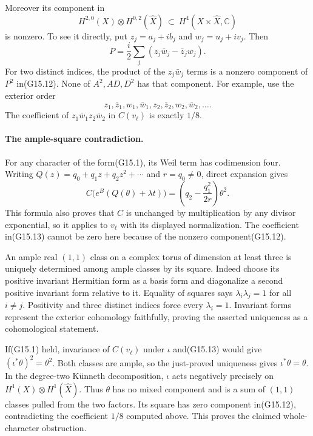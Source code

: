 Moreover its component in
\[
 H^{2,0}(X)\otimes H^{0,2}(\widehat X)
          \ \subset\ H^4(X\times\widehat X,\mathbb C)       \tag{G15.12}
\]
is nonzero. To see it directly, put
$z_j=a_j+ib_j$ and $w_j=u_j+iv_j$. Then
\[
       P=\frac{i}{2}\sum_j
             (z_j\bar w_j-\bar z_jw_j).
\]
For two distinct indices, the product of the
$z_j\bar w_j$ terms is a nonzero component of $P^2$
in(G15.12). None of $A^2,AD,D^2$ has that component.
For example, use the exterior order
\[
       z_1,\bar z_1,w_1,\bar w_1,z_2,\bar z_2,w_2,\bar w_2,\ldots.
\]
The coefficient of
$z_1\bar w_1z_2\bar w_2$ in $C(v_\ell)$ is exactly $1/8$.

\paragraph{The ample-square contradiction.}
For any character of the form(G15.1), its Weil term has
codimension four. Writing $Q(z)=q_0+q_1z+q_2z^2+\cdots$
and $r=q_0\ne0$, direct expansion gives
\[
       C\bigl(e^B(Q(\theta)+\lambda t)\bigr)
               =\left(q_2-\frac{q_1^2}{2r}\right)\theta^2.
                                                               \tag{G15.13}
\]
This formula also proves that $C$ is unchanged by
multiplication by any divisor exponential, so it applies
to $v_\ell$ with its displayed normalization.
The coefficient in(G15.13) cannot be zero here because
of the nonzero component(G15.12).

An ample real $(1,1)$ class on a complex torus of dimension
at least three is uniquely determined among ample classes
by its square. Indeed choose its positive invariant
Hermitian form as a basis form and diagonalize a second
positive invariant form relative to it. Equality of
squares says $\lambda_i\lambda_j=1$ for all $i\ne j$.
Positivity and three distinct indices force every
$\lambda_i=1$. Invariant forms represent the exterior
cohomology faithfully, proving the asserted uniqueness
as a cohomological statement.

If(G15.1) held, invariance of $C(v_\ell)$ under $\iota$
and(G15.13) would give
$(\iota^*\theta)^2=\theta^2$. Both classes are ample,
so the just-proved uniqueness gives $\iota^*\theta=\theta$.
In the degree-two K\"unneth decomposition, $\iota$
acts negatively precisely on
$H^1(X)\otimes H^1(\widehat X)$.
Thus $\theta$ has no mixed component and is a sum
of $(1,1)$ classes pulled from the two factors.
Its square has zero component in(G15.12), contradicting
the coefficient $1/8$ computed above.
This proves the claimed whole-character obstruction.

